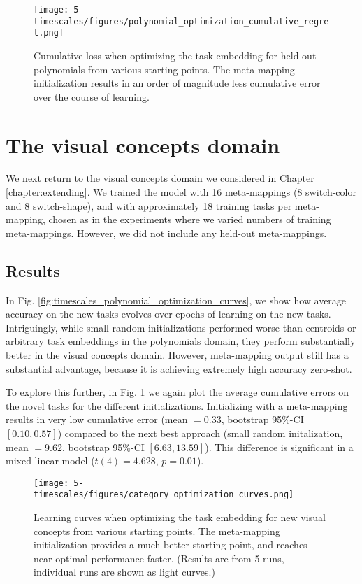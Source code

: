 \begin{figure}[p]
\centering
\texttt{[image: 5-timescales/figures/polynomial\_optimization\_cumulative\_regret.png]}
\caption[Cumulative loss when optimizing the task embedding for held-out polynomials from various starting points.]{Cumulative loss when optimizing the task embedding for held-out polynomials from various starting points. The meta-mapping initialization results in an order of magnitude less cumulative error over the course of learning.} \label{fig:timescales_polynomial_optimization_regret}
\end{figure}

\section{The visual concepts domain}

We next return to the visual concepts domain we considered in Chapter \ref{chapter:extending}. We trained the model with 16 meta-mappings (8 switch-color and 8 switch-shape), and with approximately 18 training tasks per meta-mapping, chosen as in the experiments where we varied numbers of training meta-mappings. However, we did not include any held-out meta-mappings. 

\subsection{Results}
In Fig. \ref{fig:timescales_polynomial_optimization_curves}, we show how average accuracy on the new tasks evolves over epochs of learning on the new tasks. Intriguingly, while small random initializations performed worse than centroids or arbitrary task embeddings in the polynomials domain, they perform substantially better in the visual concepts domain. However, meta-mapping output still has a substantial advantage, because it is achieving extremely high accuracy zero-shot. \par 
To explore this further, in Fig. \ref{fig:timescales_polynomial_optimization_regret} we again plot the average cumulative errors on the novel tasks for the different initializations. Initializing with a meta-mapping results in very low cumulative error (mean \(= 0.33\), bootstrap 95\%-CI \([0.10, 0.57]\)) compared to the next best approach (small random initalization, mean \(= 9.62\), bootstrap 95\%-CI \([6.63, 13.59]\)). This difference is significant in a mixed linear model (\(t(4) = 4.628\), \(p = 0.01\)). \par
\begin{figure}
\centering
\texttt{[image: 5-timescales/figures/category\_optimization\_curves.png]}
\caption[Learning curves when optimizing the task embedding for new visual concepts from various starting points.]{Learning curves when optimizing the task embedding for new visual concepts from various starting points. The meta-mapping initialization provides a much better starting-point, and reaches near-optimal performance faster. (Results are from 5 runs, individual runs are shown as light curves.)} \label{fig:timescales_category_optimization_curves}
\end{figure}

